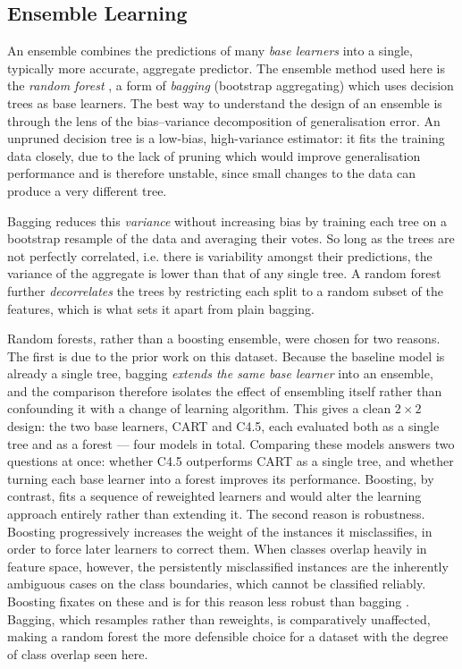 \documentclass[conference]{IEEEtran}
\begin{document}
\subsection{Ensemble Learning} %

An ensemble combines the predictions of many \emph{base learners} into a single, typically more
accurate, aggregate predictor. The ensemble method used here is the \emph{random
forest} \cite{breiman2001randomforests}, a form of \emph{bagging} (bootstrap
aggregating) \cite{breiman1996bagging} which uses decision trees as base learners. 
The best way to understand the design of an ensemble is through the lens of the
bias--variance decomposition of generalisation error. 
An unpruned decision tree is a low-bias, high-variance estimator: it fits the training
data closely, due to the lack of pruning which would improve generalisation performance and is therefore
unstable, since small changes to the data can produce a very different tree. 

Bagging reduces this \emph{variance} without increasing bias
by training each tree on a bootstrap resample of the data and averaging their votes.
So long as the trees are not perfectly correlated, i.e. there is variability amongst their predictions,
the variance of the aggregate is lower than that of any single tree. 
A random forest further \emph{decorrelates} the trees by
restricting each split to a random subset of the features, which is what sets it apart
from plain bagging.

Random forests, rather than a boosting ensemble, were chosen for two reasons. The first
is due to the prior work on this dataset. Because the baseline model is already a single tree, bagging
\emph{extends the same base learner} into an ensemble, and the comparison therefore
isolates the effect of ensembling itself rather than confounding it with a change of
learning algorithm. This gives a clean $2\times2$ design: the two base learners, CART and C4.5, each evaluated
both as a single tree and as a forest --- four models in total. Comparing these models
answers two questions at once: whether C4.5 outperforms CART as a single tree, and whether
turning each base learner into a forest improves its performance.
Boosting, by contrast, fits a sequence of reweighted learners and would
alter the learning approach entirely rather than extending it. The second
reason is robustness. Boosting progressively increases the weight of the
instances it misclassifies, in order to force later learners to correct them. When
classes overlap heavily in feature space, however, the persistently misclassified
instances are the inherently ambiguous cases on the class boundaries, which cannot be
classified reliably. Boosting fixates on these and is for this reason less robust than
bagging \cite{dietterich2000}. Bagging, which resamples rather than reweights, is
comparatively unaffected, making a random forest the more defensible choice for a dataset
with the degree of class overlap seen here.
\end{document}
